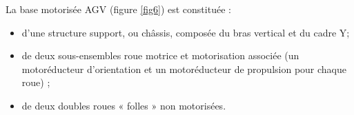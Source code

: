 \begin{multicols}{2}
\begin{multicols}{2}
%
%
%
%
%

La base motorisée AGV (figure \ref{fig6}) est constituée :
\begin{itemize}
\item d’une structure support, ou châssis, composée du bras vertical et du cadre Y;
\item de deux sous-ensembles roue motrice et motorisation associée (un motoréducteur d’orientation
et un motoréducteur de propulsion pour chaque roue) ;
\item de deux doubles roues « folles » non motorisées.
\end{itemize}



\end{multicols}
\end{multicols}
